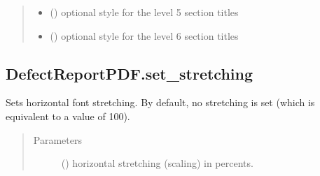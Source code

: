 \documentclass[letterpaper,10pt,english]{sphinxmanual}
\begin{document}
\begin{fulllineitems}
\begin{fulllineitems}
\begin{quote}
\begin{description}
\begin{itemize}
\item {} 
\sphinxAtStartPar
{} () \textendash{} optional style for the level 5 section titles

\item {} 
\sphinxAtStartPar
{} () \textendash{} optional style for the level 6 section titles

\end{itemize}

\end{description}\end{quote}

\end{fulllineitems}



\subsection{DefectReportPDF.set\_stretching}
\label{\detokenize{generated/quality_assessment.quality_pdf_report.DefectReportPDF.set_stretching:defectreportpdf-set-stretching}}\label{\detokenize{generated/quality_assessment.quality_pdf_report.DefectReportPDF.set_stretching::doc}}

\begin{fulllineitems}
\label{\detokenize{generated/quality_assessment.quality_pdf_report.DefectReportPDF.set_stretching:quality_assessment.quality_pdf_report.DefectReportPDF.set_stretching}}
\sphinxAtStartPar
Sets horizontal font stretching.
By default, no stretching is set (which is equivalent to a value of 100).
\begin{quote}\begin{description}
\item[{Parameters}] \leavevmode
\sphinxAtStartPar
{} () \textendash{} horizontal stretching (scaling) in percents.

\end{description}\end{quote}


\end{fulllineitems}
\end{fulllineitems}
\end{document}
